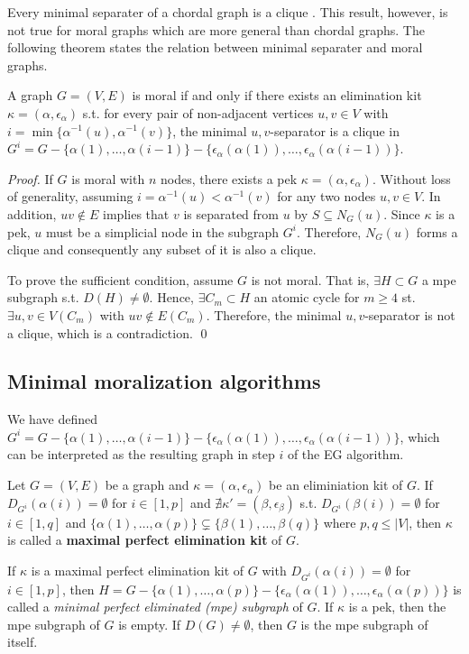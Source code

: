 Every minimal separater of a chordal graph is a clique \cite{dirac1961rigid}. This result, however, is not true for moral graphs which are more general than chordal graphs. The following theorem states the relation between minimal separater and moral graphs. 
\begin{theorem}
A graph $G=(V,E)$ is moral if and only if there exists an elimination kit $\kappa=(\alpha,\epsilon_{\alpha})$ s.t. for every pair of non-adjacent vertices $u,v\in V$ with $i=\min\{\alpha^{-1}(u),\alpha^{-1}(v)\}$, the minimal $u,v$-separator is a clique in $G^i=G-\{\alpha(1),\dots,\alpha(i-1)\}-\{\epsilon_{\alpha}(\alpha(1)),\dots,\epsilon_{\alpha}(\alpha(i-1))\}$.
\end{theorem}
\begin{proof}
If $G$ is moral with $n$ nodes, there exists a pek $\kappa=(\alpha, \epsilon_{\alpha})$. Without loss of generality, assuming $i=\alpha^{-1}(u) < \alpha^{-1}(v)$ for any two nodes $u,v \in V$. In addition, $uv \notin E$ implies that $v$ is separated from $u$ by $S\subseteq N_G(u)$. Since $\kappa$ is a pek, $u$ must be a simplicial node in the subgraph $G^i$. Therefore, $N_G(u)$ forms a clique and consequently any subset of it is also a clique. 

To prove the sufficient condition, assume $G$ is not moral. That is, $\exists H \subset G$ a mpe subgraph s.t. $D(H)\neq \emptyset$. Hence, $\exists C_m \subset H$ an atomic cycle for $m \ge 4$ st. $\exists u,v \in V(C_m)$ with $uv \notin E(C_m)$. Therefore, the minimal $u,v$-separator is not a clique, which is a contradiction. \qed
\end{proof}


\subsection{Minimal moralization algorithms}
We have defined $G^i=G-\{\alpha(1),\dots,\alpha(i-1)\}-\{\epsilon_{\alpha}(\alpha(1)),\dots,\epsilon_{\alpha}(\alpha(i-1))\}$, which can be interpreted as the resulting graph in step $i$ of the EG algorithm. 
\begin{definition}
Let $G=(V,E)$ be a graph and $\kappa=(\alpha,\epsilon_{\alpha})$ be an eliminiation kit of $G$. If $D_{G^i}(\alpha(i))=\emptyset$ for $i \in [1,p]$ and $\nexists \kappa'=(\beta,\epsilon_{\beta})$ s.t. $D_{G^i}(\beta(i))=\emptyset$ for $i \in [1,q]$ and $\{\alpha(1),\dots,\alpha(p)\}\subsetneq \{\beta(1),\dots,\beta(q)\}$ where $p,q \le |V|$, then $\kappa$ is called a \textbf{maximal perfect elimination kit} of $G$.
\end{definition}
If $\kappa$ is a maximal perfect elimination kit of $G$ with $D_{G^i}(\alpha(i))=\emptyset$ for $i \in [1,p]$, then $H=G-\{\alpha(1),\dots,\alpha(p)\}-\{\epsilon_{\alpha}(\alpha(1)),\dots,\epsilon_{\alpha}(\alpha(p))\}$ is called a \textit{minimal perfect eliminated (mpe) subgraph} of $G$. If $\kappa$ is a pek, then the mpe subgraph of $G$ is empty. If $D(G)\neq \emptyset$, then $G$ is the mpe subgraph of itself. 


